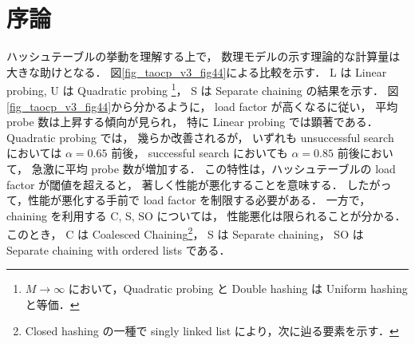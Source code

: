 \chapter{序論}
\label{chap_Introduction}

ハッシュテーブルの挙動を理解する上で，
数理モデルの示す理論的な計算量は大きな助けとなる．
図\ref{fig_taocp_v3_fig44}に\cite{knuth1998}よる比較を示す．
L は Linear probing,
U は Quadratic probing \footnote{$M \rightarrow \infty$ において，Quadratic probing と Double hashing は Uniform hashing と等価．}，
S は Separate chaining の結果を示す．
図\ref{fig_taocp_v3_fig44}から分かるように，
load factor が高くなるに従い，
平均 probe 数は上昇する傾向が見られ，
特に Linear probing では顕著である．
Quadratic probing では，
幾らか改善されるが，
いずれも
unsuccessful search においては $\alpha = 0.65$ 前後，
successful search においても $\alpha = 0.85$ 前後において，
急激に平均 probe 数が増加する．
この特性は，ハッシュテーブルの load factor が閾値を超えると，
著しく性能が悪化することを意味する．
したがって，性能が悪化する手前で load factor を制限する必要がある．
一方で，chaining を利用する C, S, SO については，
性能悪化は限られることが分かる．
このとき，
C は Coalesced Chaining\footnote{Closed hashing の一種で singly linked list により，次に辿る要素を示す．}，
S は Separate chaining，
SO は Separate chaining with ordered lists である．




